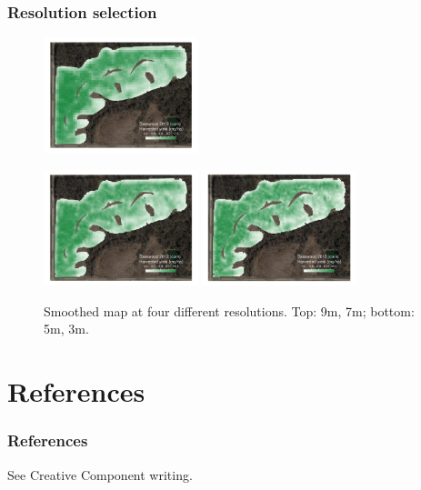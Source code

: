 \documentclass{beamer}
\begin{document}
\begin{frame}
  \frametitle{Resolution selection}
  
  \begin{figure}
    \includegraphics[width=0.4\textwidth]{./figures/maps/basswood_2012_06_smoothed_res7_7.png}

    \vspace{0px}
    
    \includegraphics[width=0.4\textwidth]{./figures/maps/basswood_2012_06_smoothed_res5_5.png}
    \includegraphics[width=0.4\textwidth]{./figures/maps/basswood_2012_06_smoothed_res3_3.png}

    \caption{Smoothed map at four different resolutions. Top: 9m, 7m;
      bottom: 5m, 3m.}

  \end{figure}
  
  
\end{frame}


\section*{References}

\begin{frame}[allowframebreaks]
  \frametitle{References}

  See Creative Component writing.


\end{frame}
\end{document}
